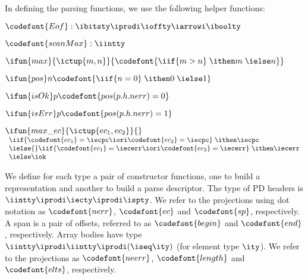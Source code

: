 In defining the parsing functions, we use the following helper functions:
\begin{description}
\item $\codefont {Eof} : \ibitsty \iprodi \ioffty \iarrowi \iboolty$

\item $\codefont{scanMax} : \iintty$

\item $\ifun {max} {\ictup{m,n}} {\codefont{\iif {m>n}\; \ithen m\; \ielse n}}$
\item $\ifun {pos} n {\codefont{\iif {n=0}\; \ithen 0\; \ielse 1}}$
\item $\ifun {isOk} p {\codefont{pos(p.h.nerr) = 0}}$
\item $\ifun {isErr} p {\codefont{pos(p.h.nerr) = 1}}$

\item $\ifun {max\_ec} {\ictup{ec_1, ec_2}} {}$ \\
  $\begin{array}{l}
    \iif {\codefont{ec_1} = \iecpc \iori \codefont{ec_2} = \iecpc}\; \ithen \iecpc \\
    \ielse{} \iif {\codefont{ec_1} = \iecerr \iori \codefont{ec_2} = \iecerr}\; \ithen \iecerr \\
    \ielse \iok
   \end{array}$
\end{description}

We define for each \ddc{} type a pair of constructor functions, one to build a representation and another to build a parse descriptor.
The type of PD headers is $\iintty
  \iprodi \iecty \iprodi \ispty$. We refer to the projections using
  dot notation as $\codefont{nerr}$, $\codefont{ec}$ and
  $\codefont{sp}$, respectively. A span is a pair of offsets, referred
  to as $\codefont{begin}$ and $\codefont{end}$, respectively. Array
  bodies have type $\iintty \iprodi \iintty \iprodi (\iseq \ity)$ (for
  element type $\ity$). We refer to the projections as
  $\codefont{neerr}$, $\codefont{length}$ and $\codefont{elts}$,
  respectively.  

